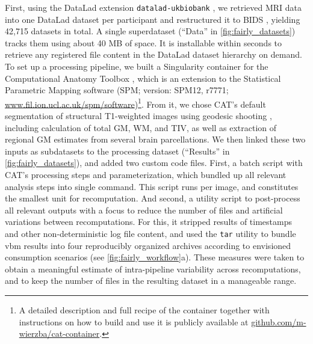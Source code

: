 First, using the DataLad extension \texttt{datalad-ukbiobank} \citep{hanke_michael_2022_7296550}, we retrieved MRI data into one DataLad dataset per participant and restructured it to BIDS \citep{gorgolewski2016brain}, yielding 42,715 datasets in total.
A single superdataset (``Data'' in \cref{fig:fairly_datasets}) tracks them using about 40 MB of space.
It is installable within seconds to retrieve any registered file content in the DataLad dataset hierarchy on demand.\\
To set up a processing pipeline, we built a Singularity container for the Computational Anatomy Toolbox \citep[CAT; version: CAT12.7-RC2, r1720]{gaser}, which is an extension to the Statistical Parametric Mapping software (SPM; version: SPM12, r7771; \url{www.fil.ion.ucl.ac.uk/spm/software})\footnote{A detailed description and full recipe of the container together with instructions on how to build and use it is publicly available at \url{github.com/m-wierzba/cat-container}.}.
From it, we chose \gls{CAT}'s default segmentation of structural T1-weighted images using geodesic shooting \citep{ashburner2011diffeomorphic}, including calculation of total \gls{GM}, \gls{WM}, and \gls{TIV}, as well as extraction of regional \gls{GM} estimates from several brain parcellations.
We then linked these two inputs as subdatasets to the processing dataset (``Results'' in \cref{fig:fairly_datasets}), and added two custom code files.
First, a batch script with \gls{CAT}'s processing steps and parameterization, which bundled up all relevant analysis steps into single command.
This script runs per image, and constitutes the smallest unit for recomputation.
And second, a utility script to post-process all relevant outputs with a focus to reduce the number of files and artificial variations between recomputations.
For this, it stripped results of timestamps and other non-deterministic log file content, and used the \texttt{tar} utility to bundle \gls{vbm} results into four reproducibly organized archives according to envisioned consumption scenarios (see \cref{fig:fairly_workflow}a).
These measures were taken to obtain a meaningful estimate of intra-pipeline variability across recomputations, and to keep the number of files in the resulting dataset in a manageable range.\\
